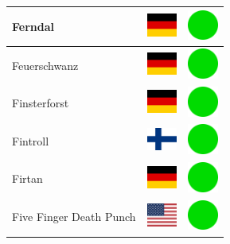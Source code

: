 \documentclass[12pt, a4paper, twoside]{report}
\begin{document}
\begin{center}
\begin{longtable}{|p{5cm}|p{2cm}|p{2cm}|}
 Ferndal                                                    & \includegraphics[width=1cm]{../4x3/de} &   \includegraphics[width=1cm]{../likes/y} \\ \hline
 Feuerschwanz                                               & \includegraphics[width=1cm]{../4x3/de} &   \includegraphics[width=1cm]{../likes/y} \\ \hline
 Finsterforst                                               & \includegraphics[width=1cm]{../4x3/de} &   \includegraphics[width=1cm]{../likes/y} \\ \hline
 Fintroll                                                   & \includegraphics[width=1cm]{../4x3/fi} &   \includegraphics[width=1cm]{../likes/y} \\ \hline
 Firtan                                                     & \includegraphics[width=1cm]{../4x3/de} &   \includegraphics[width=1cm]{../likes/y} \\ \hline
 Five Finger Death Punch                                    & \includegraphics[width=1cm]{../4x3/us} &   \includegraphics[width=1cm]{../likes/y} \\ \hline

\end{longtable}
\end{center}
\end{document}
